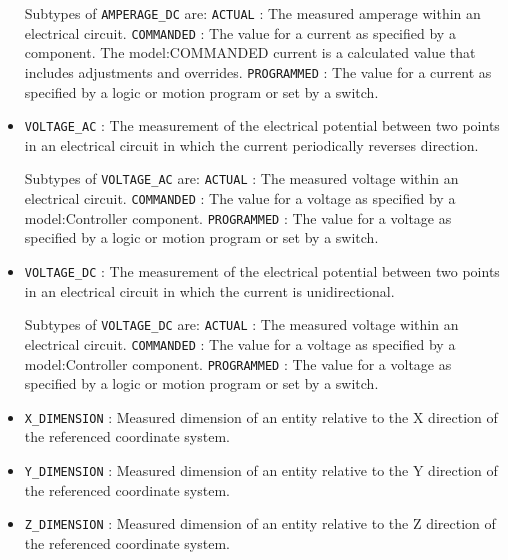 \begin{itemize}
Subtypes of \texttt{AMPERAGE_DC} are: 
\newline\tab \texttt{ACTUAL} : The measured amperage within an electrical circuit. 
\newline\tab \texttt{COMMANDED} : The value for a current as specified by a component. 
The {model:COMMANDED} current is a calculated value that includes adjustments and overrides. 
\newline\tab \texttt{PROGRAMMED} : The value for a current as specified by a logic or motion program or set by a switch. 
\item \texttt{VOLTAGE_AC} : The measurement of the electrical potential between two points in an electrical circuit in which the current periodically reverses direction. 

Subtypes of \texttt{VOLTAGE_AC} are: 
\newline\tab \texttt{ACTUAL} : The measured voltage within an electrical circuit. 
\newline\tab \texttt{COMMANDED} : The value for a voltage as specified by a {model:Controller} component. 
\newline\tab \texttt{PROGRAMMED} : The value for a voltage as specified by a logic or motion program or set by a switch. 
\item \texttt{VOLTAGE_DC} : The measurement of the electrical potential between two points in an electrical circuit in which the current is unidirectional. 

Subtypes of \texttt{VOLTAGE_DC} are: 
\newline\tab \texttt{ACTUAL} : The measured voltage within an electrical circuit. 
\newline\tab \texttt{COMMANDED} : The value for a voltage as specified by a {model:Controller} component. 
\newline\tab \texttt{PROGRAMMED} : The value for a voltage as specified by a logic or motion program or set by a switch. 
\item \texttt{X_DIMENSION} : Measured dimension of an entity relative to the X direction of the referenced coordinate system.
 

\item \texttt{Y_DIMENSION} : Measured dimension of an entity relative to the Y direction of the referenced coordinate system. 

\item \texttt{Z_DIMENSION} : Measured dimension of an entity relative to the Z direction of the referenced coordinate system. 


\end{itemize}
